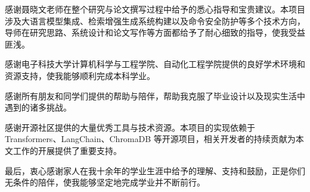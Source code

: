 \thesisacknowledgement

感谢聂晓文老师在整个研究与论文撰写过程中给予的悉心指导和宝贵建议。本项目涉及大语言模型集成、检索增强生成系统构建以及命令安全防护等多个技术方向，导师在研究思路、系统设计和论文写作等方面都给予了耐心细致的指导，使我受益匪浅。

感谢电子科技大学计算机科学与工程学院、自动化工程学院提供的良好学术环境和资源支持，使我能够顺利完成本科学业。

感谢所有朋友和同学们提供的帮助与陪伴，帮助我克服了毕业设计以及现实生活中遇到的诸多挑战。

感谢开源社区提供的大量优秀工具与技术资源。本项目的实现依赖于 Transformers、LangChain、ChromaDB 等开源项目，相关开发者的持续贡献为本文工作的开展提供了重要支持。

最后，衷心感谢家人在我十余年的学业生涯中给予的理解、支持和鼓励，正是你们无条件的陪伴，使我能够坚定地完成学业并不断前行。